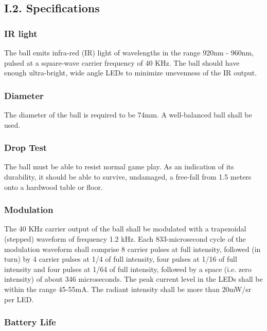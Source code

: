 \documentclass{article}
\begin{document}
\subsection{I.2. Specifications}

\subsubsection{IR light}

The ball emits infra-red (IR) light of wavelengths in the range 920nm - 960nm,
pulsed at a square-wave carrier frequency of 40 KHz. The ball should have
enough ultra-bright, wide angle LEDs to minimize unevenness of the IR output.

\subsubsection{Diameter}

The diameter of the ball is required to be 74mm. A well-balanced ball shall be
used.

\subsubsection{Drop Test}

The ball must be able to resist normal game play. As an indication of its
durability, it should be able to survive, undamaged, a free-fall from 1.5
meters onto a hardwood table or floor.

\subsubsection{Modulation}

The 40 KHz carrier output of the ball shall be modulated with a trapezoidal
(stepped) waveform of frequency 1.2 kHz. Each 833-microsecond cycle of the
modulation waveform shall comprise 8 carrier pulses at full intensity, followed
(in turn) by 4 carrier pulses at 1/4 of full intensity, four pulses at 1/16 of
full intensity and four pulses at 1/64 of full intensity, followed by a space
(i.e. zero intensity) of about 346 microseconds. The peak current level in the
LEDs shall be within the range 45-55mA. The radiant intensity shall be more
than 20mW/sr per LED.

\subsubsection{Battery Life}
\end{document}

